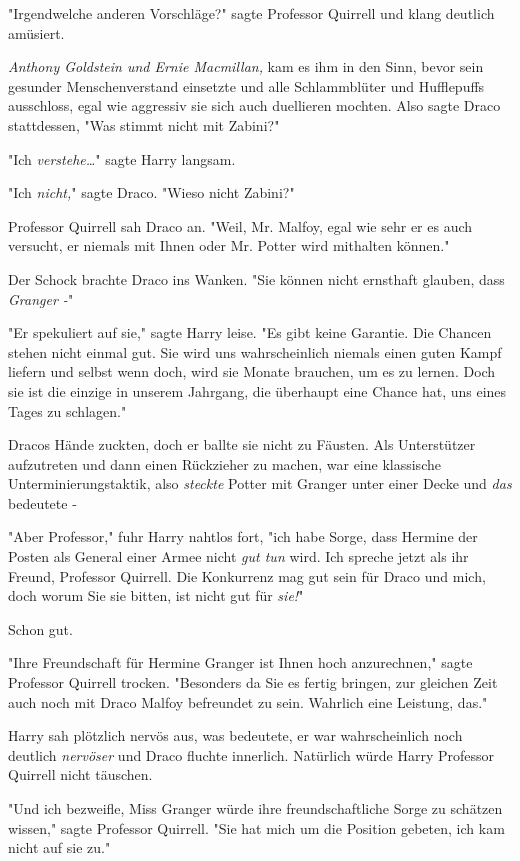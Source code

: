 {"Irgendwelche anderen Vorschläge?" sagte Professor Quirrell und klang deutlich amüsiert.

\emph{Anthony Goldstein und Ernie Macmillan,} kam es ihm in den Sinn, bevor sein gesunder Menschenverstand einsetzte und alle Schlammblüter und Hufflepuffs ausschloss, egal wie aggressiv sie sich auch duellieren mochten. Also sagte Draco stattdessen, "Was stimmt nicht mit Zabini?"

"Ich \emph{verstehe…}" sagte Harry langsam.

"Ich \emph{nicht,}" sagte Draco. "Wieso nicht Zabini?"

Professor Quirrell sah Draco an. "Weil, Mr. Malfoy, egal wie sehr er es auch versucht, er niemals mit Ihnen oder Mr. Potter wird mithalten können."

Der Schock brachte Draco ins Wanken. "Sie können nicht ernsthaft glauben, dass \emph{Granger -}"

"Er spekuliert auf sie," sagte Harry leise. "Es gibt keine Garantie. Die Chancen stehen nicht einmal gut. Sie wird uns wahrscheinlich niemals einen guten Kampf liefern und selbst wenn doch, wird sie Monate brauchen, um es zu lernen. Doch sie ist die einzige in unserem Jahrgang, die überhaupt eine Chance hat, uns eines Tages zu schlagen."

Dracos Hände zuckten, doch er ballte sie nicht zu Fäusten. Als Unterstützer aufzutreten und dann einen Rückzieher zu machen, war eine klassische Unterminierungstaktik, also \emph{steckte} Potter mit Granger unter einer Decke und \emph{das} bedeutete -

"Aber Professor," fuhr Harry nahtlos fort, "ich habe Sorge, dass Hermine der Posten als General einer Armee nicht \emph{gut tun} wird. Ich spreche jetzt als ihr Freund, Professor Quirrell. Die Konkurrenz mag gut sein für Draco und mich, doch worum Sie sie bitten, ist nicht gut für \emph{sie!}"

Schon gut.

"Ihre Freundschaft für Hermine Granger ist Ihnen hoch anzurechnen," sagte Professor Quirrell trocken. "Besonders da Sie es fertig bringen, zur gleichen Zeit auch noch mit Draco Malfoy befreundet zu sein. Wahrlich eine Leistung, das."

Harry sah plötzlich nervös aus, was bedeutete, er war wahrscheinlich noch deutlich \emph{nervöser} und Draco fluchte innerlich. Natürlich würde Harry Professor Quirrell nicht täuschen.

"Und ich bezweifle, Miss Granger würde ihre freundschaftliche Sorge zu schätzen wissen," sagte Professor Quirrell. "Sie hat mich um die Position gebeten, ich kam nicht auf sie zu."

}

